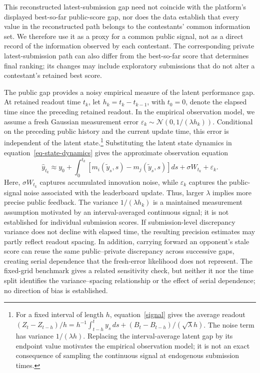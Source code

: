 \documentclass[mnsc]{informs3}
\begin{document}
This reconstructed latest-submission gap need not coincide with the platform's displayed best-so-far public-score gap, nor does the data establish that every value in the reconstructed path belongs to the contestants' common information set. We therefore use it as a proxy for a common public signal, not as a direct record of the information observed by each contestant. The corresponding private latest-submission path can also differ from the best-so-far score that determines final ranking; its changes may include exploratory submissions that do not alter a contestant's retained best score.

{The public gap provides a noisy empirical measure of the latent performance gap. {At retained readout time $t_k$, let $h_k=t_k-t_{k-1}$, with $t_0=0$, denote the elapsed time since the preceding retained readout.} In the empirical observation model, we assume a fresh Gaussian measurement error $\varepsilon_k\sim\mathcal N(0,1/(\lambda h_k))$. Conditional on the preceding public history and the current update time, this error is independent of the latent state.\footnote{{\color{black}For a fixed interval of length $h$, equation~\eqref{signal} gives the average readout $(Z_t-Z_{t-h})/h=h^{-1}\int_{t-h}^t y_s\,ds+(B_t-B_{t-h})/(\sqrt\lambda h)$. The noise term has variance $1/(\lambda h)$. Replacing the interval-average latent gap by its endpoint value motivates the empirical observation model; it is not an exact consequence of sampling the continuous signal at endogenous submission times.}} Substituting the latent state dynamics in equation~\eqref{eq-state-dynamics} gives the approximate observation equation}
\begin{equation}\label{eq-leaderboard-gap}
\hat y_{t_k}
\approx
{y_0+\int_0^{t_k}\left[m_i(\tilde{y}_s,s)-m_j(\tilde{y}_s,s)\right]ds}
+\sigma W_{t_k}
+\varepsilon_k.
\end{equation}
Here, $\sigma W_{t_k}$ captures accumulated innovation noise, while $\varepsilon_k$ captures the public-signal noise associated with the leaderboard update.
Thus, larger $\lambda$ implies more precise public feedback.
The variance $1/(\lambda h_k)$ is a maintained measurement assumption motivated by an interval-averaged continuous signal; it is not established for individual submission scores. If submission-level discrepancy variance does not decline with elapsed time, the resulting precision estimates may partly reflect readout spacing. In addition, carrying forward an opponent's stale score can reuse the same public--private discrepancy across successive gaps, creating serial dependence that the fresh-error likelihood does not represent. The fixed-grid benchmark gives a related sensitivity check, but neither it nor the time split identifies the variance--spacing relationship or the effect of serial dependence; no direction of bias is established.
\end{document}
